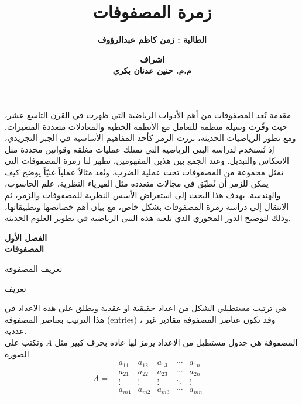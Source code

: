 



	\author{\textbf{الطالبة : زمن كاظم عبدالرؤوف}}
	\title{\textbf{زمرة المصفوفات}}
	\date{\textbf{اشراف\\
			 م.م. حنين عدنان بكري}}
	
		
		\begin{frame}
			\maketitle
		\end{frame}
		
		\begin{frame}{مقدمة}
			تُعد المصفوفات من أهم الأدوات الرياضية التي ظهرت في القرن التاسع عشر، حيث وفّرت وسيلة منظمة للتعامل مع الأنظمة الخطية والمعادلات متعددة المتغيرات. ومع تطور الرياضيات الحديثة، برزت الزمر كأحد المفاهيم الأساسية في الجبر التجريدي، إذ تُستخدم لدراسة البنى الرياضية التي تمتلك عمليات مغلقة وقوانين محددة مثل الانعكاس والتبديل. وعند الجمع بين هذين المفهومين، تظهر لنا زمرة المصفوفات التي تمثل مجموعة من المصفوفات تحت عملية الضرب، وتُعد مثالاً عملياً غنيّاً يوضح كيف يمكن للزمر أن تُطبّق في مجالات متعددة مثل الفيزياء النظرية، علم الحاسوب، والهندسة.  
			يهدف هذا البحث إلى استعراض الأسس النظرية للمصفوفات والزمر، ثم الانتقال إلى دراسة زمرة المصفوفات بشكل خاص، مع بيان أهم خصائصها وتطبيقاتها، وذلك لتوضيح الدور المحوري الذي تلعبه هذه البنى الرياضية في تطوير العلوم الحديثة.
		\end{frame}
		
		\begin{frame}
			\begin{center}\Huge
				\textbf{الفصل الأول}\\
				\textbf{المصفوفات}
			\end{center}
		\end{frame}
		
		\begin{frame}{تعريف المصفوفة}
			\begin{exampleblock}{تعريف}
				
				هي ترتيب مستطيلي الشكل من اعداد حقيقية او عقدية ويطلق على هذه الاعداد في هذا الترتيب بعناصر المصفوفة (entries) ، وقد تكون عناصر المصفوفة مقادير غير عددية.\\
				المصفوفة هي جدول مستطيل من الاعداد يرمز لها عادة بحرف كبير مثل $A$ وتكتب على الصورة
				\[
				A =
				\begin{bmatrix}
					a_{11} & a_{12} & a_{13} & \cdots & a_{1n}\\
					a_{21} & a_{22} & a_{23} & \cdots & a_{2n}\\
					\vdots & \vdots & \vdots & \ddots & \vdots\\
					a_{m1} & a_{m2} & a_{m3} & \cdots & a_{mn}\\
				\end{bmatrix}
				\]
			\end{exampleblock}
		\end{frame}
		
